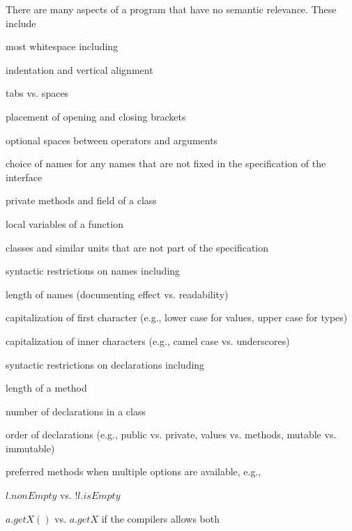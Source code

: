 There are many aspects of a program that have no semantic relevance.
These include
\begin{compactitem}
 \item most whitespace including
   \begin{compactitem}
    \item indentation and vertical alignment
    \item tabs vs. spaces
    \item placement of opening and closing brackets
    \item optional spaces between operators and arguments
   \end{compactitem}
  \item choice of names for any names that are not fixed in the specification of the interface
    \begin{compactitem}
     \item private methods and field of a class
     \item local variables of a function
     \item classes and similar units that are not part of the specification
    \end{compactitem}
  \item syntactic restrictions on names including
   \begin{compactitem}
     \item length of names (documenting effect vs. readability)
     \item capitalization of first character (e.g., lower case for values, upper case for types)
     \item capitalization of inner characters (e.g., camel case vs. underscores)
   \end{compactitem}
  \item syntactic restrictions on declarations including
   \begin{compactitem}
     \item length of a method
     \item number of declarations in a class
     \item order of declarations (e.g., public vs. private, values vs. methods, mutable vs. immutable)
   \end{compactitem}
  \item preferred methods when multiple options are available, e.g.,
   \begin{compactitem}
     \item $l.nonEmpty$ vs. $!l.isEmpty$
     \item $a.getX()$ vs. $a.getX$ if the compilers allows both

\end{compactitem}
\end{compactitem}
